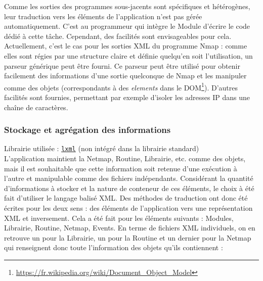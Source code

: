 \documentclass[]{article}
\begin{document}
Comme les sorties des programmes sous-jacents sont spécifiques et hétérogènes, leur traduction vers les éléments de l'application n'est pas gérée automatiquement. C'est au programmeur qui intègre le Module d'écrire le code dédié à cette tâche. Cependant, des facilités sont envisageables pour cela. Actuellement, c'est le cas pour les sorties XML du programme Nmap : comme elles sont régies par une structure claire et définie quelqu'en soit l'utilisation, un parseur générique peut être fourni. Ce parseur peut être utilisé pour obtenir facilement des informations d'une sortie quelconque de Nmap et les manipuler comme des objets (correspondants à des \textit{elements} dans le DOM\footnote{\url{https://fr.wikipedia.org/wiki/Document_Object_Model}}). D'autres facilités sont fournies, permettant par exemple d'isoler les adresses IP dans une chaîne de caractères.

\newpage

\subsubsection{Stockage et agrégation des informations}
\label{appcfg}
\noindent Librairie utilisée : \href{https://lxml.de}{\texttt{lxml}} (non intégré dans la librairie standard)\\

L'application maintient la Netmap, Routine, Librairie, etc. comme des objets, mais il est souhaitable que cette information soit retenue d'une exécution à l'autre et manipulable comme des fichiers indépendants. Considérant la quantité d'informations à stocker et la nature de conteneur de ces éléments, le choix à été fait d'utiliser le langage balisé XML. Des méthodes de traduction ont donc été écrites pour les deux sens : des éléments de l'application vers une représentation XML et inversement. Cela a été fait pour les éléments suivants : Modules, Librairie, Routine, Netmap, Events. En terme de fichiers XML individuels, on en retrouve un pour la Librairie, un pour la Routine et un dernier pour la Netmap qui renseignent donc toute l'information des objets qu'ils contiennent :\\
\end{document}
